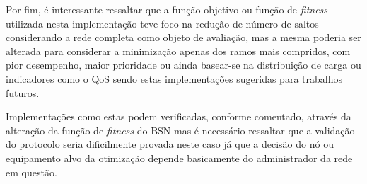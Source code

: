 Por fim, é interessante ressaltar que a função objetivo ou função de \emph{fitness} utilizada nesta implementação teve foco na redução de número de saltos considerando a rede completa como objeto de avaliação, mas a mesma poderia ser alterada para considerar a minimização apenas dos ramos mais compridos, com pior desempenho, maior prioridade ou ainda basear-se na distribuição de carga ou indicadores como o QoS sendo estas implementações sugeridas para trabalhos futuros.

Implementações como estas podem verificadas, conforme comentado, através da alteração da função de \emph{fitness} do BSN mas é necessário ressaltar que a validação do protocolo seria dificilmente provada neste caso já que a decisão do nó ou equipamento alvo da otimização depende basicamente do administrador da rede em questão.



